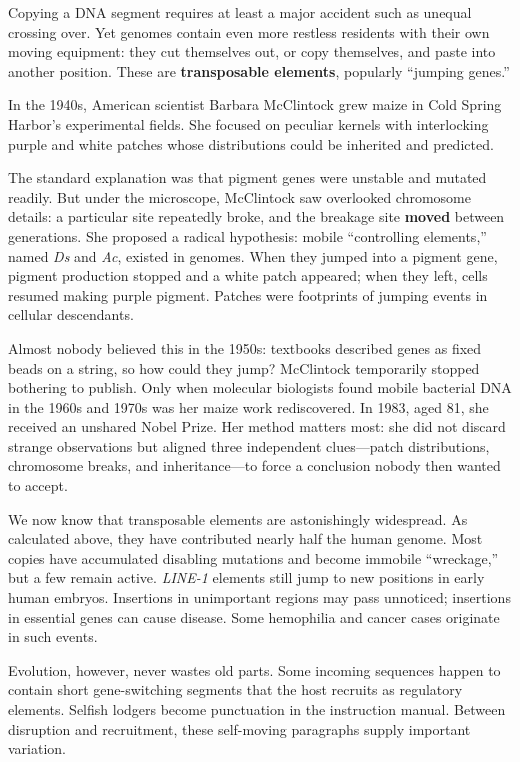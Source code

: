 Copying a DNA segment requires at least a major accident such as unequal crossing over. Yet genomes contain even more restless residents with their own moving equipment: they cut themselves out, or copy themselves, and paste into another position. These are \textbf{transposable elements}, popularly ``jumping genes.''

\begin{zhengju}
In the 1940s, American scientist Barbara McClintock grew maize in Cold Spring Harbor's experimental fields. She focused on peculiar kernels with interlocking purple and white patches whose distributions could be inherited and predicted.

The standard explanation was that pigment genes were unstable and mutated readily. But under the microscope, McClintock saw overlooked chromosome details: a particular site repeatedly broke, and the breakage site \textbf{moved} between generations. She proposed a radical hypothesis: mobile ``controlling elements,'' named \emph{Ds} and \emph{Ac}, existed in genomes. When they jumped into a pigment gene, pigment production stopped and a white patch appeared; when they left, cells resumed making purple pigment. Patches were footprints of jumping events in cellular descendants.

Almost nobody believed this in the 1950s: textbooks described genes as fixed beads on a string, so how could they jump? McClintock temporarily stopped bothering to publish. Only when molecular biologists found mobile bacterial DNA in the 1960s and 1970s was her maize work rediscovered. In 1983, aged 81, she received an unshared Nobel Prize. Her method matters most: she did not discard strange observations but aligned three independent clues---patch distributions, chromosome breaks, and inheritance---to force a conclusion nobody then wanted to accept.
\end{zhengju}

We now know that transposable elements are astonishingly widespread. As calculated above, they have contributed nearly half the human genome. Most copies have accumulated disabling mutations and become immobile ``wreckage,'' but a few remain active. \emph{LINE-1} elements still jump to new positions in early human embryos. Insertions in unimportant regions may pass unnoticed; insertions in essential genes can cause disease. Some hemophilia and cancer cases originate in such events.

Evolution, however, never wastes old parts. Some incoming sequences happen to contain short gene-switching segments that the host recruits as regulatory elements. Selfish lodgers become punctuation in the instruction manual. Between disruption and recruitment, these self-moving paragraphs supply important variation.

